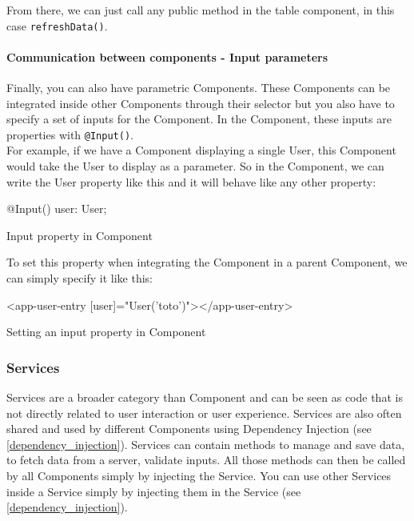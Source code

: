 \documentclass[twoside, openright,11pt,a4paper]{book}
\newenvironment{code}{\captionsetup{type=listing}}{}
\begin{document}
From there, we can just call any public method in the table component, in this case \verb+refreshData()+.

\paragraph{Communication between components - Input parameters}
\label{input_angular}
Finally, you can also have parametric Components. These Components can be integrated inside other Components through their selector but you also have to specify a set of inputs for the Component. In the Component, these inputs are properties with \verb+@Input()+. \\

For example, if we have a Component displaying a single User, this Component would take the User to display as a parameter. So in the Component, we can write the User property like this and it will behave like any other property:
\begin{code}
	\begin{inlinets}
@Input() user: User;
	\end{inlinets}
	\caption{Input property in Component}
\end{code}

To set this property when integrating the Component in a parent Component, we can simply specify it like this:
\begin{code}
	\begin{inlinehtml}
<app-user-entry [user]="User('toto')"></app-user-entry>
	\end{inlinehtml}
	\caption{Setting an input property in Component}
\end{code}
\subsubsection{Services}
Services\cite{angular:doc:services} are a broader category than Component and can be seen as code that is not directly related to user interaction or user experience. Services are also often shared and used by different Components using Dependency Injection\cite{angular:doc:dependency_injection} (see \ref{dependency_injection}). Services can contain methods to manage and save data, to fetch data from a server, validate inputs. All those methods can then be called by all Components simply by injecting the Service. You can use other Services inside a Service simply by injecting them in the Service (see \ref{dependency_injection}).\\
\end{document}
